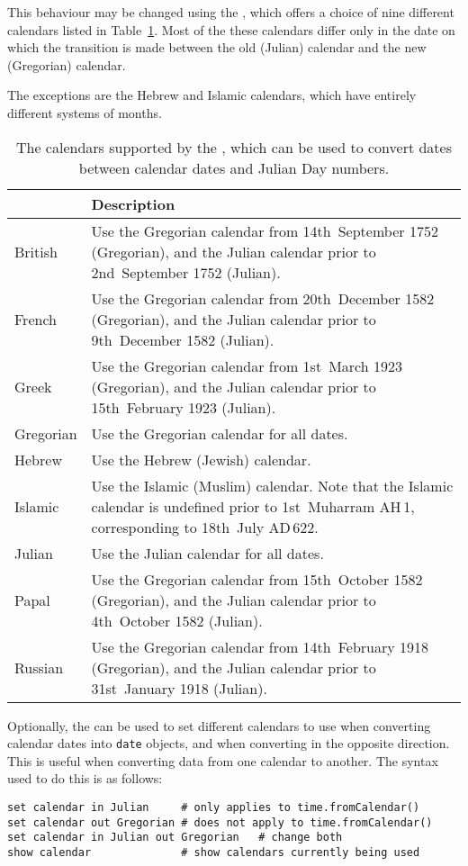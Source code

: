 This behaviour may be changed using the , which offers a
choice of nine different calendars listed in Table~\ref{tab:calendars}. Most of
the these calendars differ only in the date on which the transition is made
between the old (Julian) calendar and the new (Gregorian) calendar.

The exceptions are the Hebrew and Islamic calendars, which have entirely
different systems of months.

\begin{table}
\begin{center}
\begin{tabular}{|>{\columncolor{LightGrey}}l|>{\columncolor{LightGrey}}p{9cm}|}
\hline
{\bf Calendar} & {\bf Description} \\
\hline
British &
Use the Gregorian calendar from 14th~September 1752 (Gregorian), and the Julian calendar prior to 2nd~September 1752 (Julian). \\
French &
Use the Gregorian calendar from 20th~December 1582 (Gregorian), and the Julian
calendar prior to 9th~December 1582 (Julian). \\
Greek &
Use the Gregorian calendar from 1st~March 1923 (Gregorian), and the Julian
calendar prior to 15th~February 1923 (Julian). \\
Gregorian &
Use the Gregorian calendar for all dates. \\
Hebrew &
Use the Hebrew (Jewish) calendar. \\
Islamic &
Use the Islamic (Muslim) calendar. Note that the Islamic calendar is undefined prior to 1st~Muharram {\footnotesize AH}\,1, corresponding to 18th~July {\footnotesize AD}\,622. \\
Julian &
Use the Julian calendar for all dates. \\
Papal &
Use the Gregorian calendar from 15th~October 1582 (Gregorian), and the Julian
calendar prior to 4th~October 1582 (Julian). \\
Russian &
Use the Gregorian calendar from 14th~February 1918 (Gregorian), and the Julian
calendar prior to 31st~January 1918 (Julian). \\
\hline
\end{tabular}
\end{center}
\caption{The calendars supported by the , which can be
used to convert dates between calendar dates and Julian Day numbers.}
\label{tab:calendars}
\end{table}

Optionally, the  can be used to set different calendars
to use when converting calendar dates into {\tt date} objects, and when
converting in the opposite direction. This is useful when converting data from
one calendar to another. The syntax used to do this is as follows:
\begin{verbatim}
set calendar in Julian     # only applies to time.fromCalendar()
set calendar out Gregorian # does not apply to time.fromCalendar()
set calendar in Julian out Gregorian   # change both
show calendar              # show calendars currently being used
\end{verbatim}


